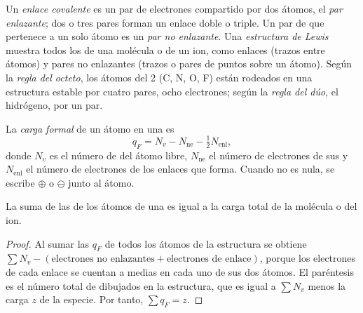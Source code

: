 \begin{definition}\label{def:b1:lewis-resonance-vsepr:lewis}
Un \emph{enlace covalente} es un par de electrones
compartido por dos átomos, el \emph{par enlazante};
dos o tres pares forman un enlace doble o triple. Un par de  que pertenece a un solo átomo es un \emph{par no
enlazante}. Una \emph{estructura de
Lewis} muestra todos los 
de una molécula o de un ion, como enlaces (trazos entre átomos) y pares no
enlazantes (trazos o pares de puntos sobre un átomo). Según la \emph{regla
del octeto}, los átomos del  2 (C, N, O, F)
están rodeados en una estructura estable por cuatro pares, ocho
electrones; según la \emph{regla del dúo}, el hidrógeno, por un
par.
\end{definition}

\begin{definition}\label{def:b1:lewis-resonance-vsepr:formal-charge}
La \emph{carga formal} de un átomo en una  es
\[
  q_F = N_v - N_{\text{ne}} - \tfrac12 N_{\text{enl}},
\]
donde $N_v$ es el número de  del átomo libre,
$N_{\text{ne}}$ el número de electrones de sus  y
$N_{\text{enl}}$ el número de electrones de los enlaces que forma. Cuando
no es nula, se escribe $\oplus$ o $\ominus$ junto al átomo.
\end{definition}

\begin{proposition}\label{prop:b1:lewis-resonance-vsepr:formal-sum}
La suma de las  de los átomos de una 
es igual a la carga total de la molécula o del ion.
\end{proposition}

\begin{proof}
Al sumar las  $q_F$ de todos los átomos de la estructura se
obtiene $\sum N_v - (\text{electrones
no enlazantes} + \text{electrones de enlace})$, porque los
electrones de cada enlace se cuentan a medias en cada uno de sus dos
átomos. El paréntesis es el número total de 
dibujados en la estructura, que es igual a $\sum N_v$ menos la carga $z$
de la especie. Por tanto, $\sum q_F = z$.
\end{proof}

